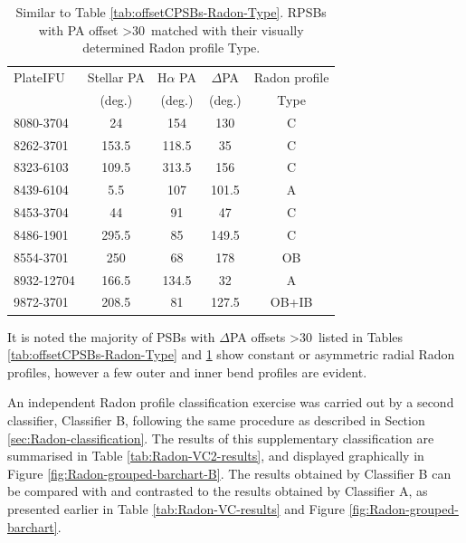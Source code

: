 \begin{table}
\centering
\caption[RPSBs with PA offset \textgreater 30\textdegree\ matched with their visually determined Radon profile Type]{Similar to Table \ref{tab:offsetCPSBs-Radon-Type}. RPSBs with PA offset \textgreater 30\textdegree\ matched with their visually determined Radon profile Type.}
\label{tab:offsetRPSBs-Radon-Type}
\begin{tabular}{lcccc}
\hline
PlateIFU   & Stellar PA & H$\alpha$ PA & $\Delta$PA & Radon profile \\
  & (deg.) & (deg.) & (deg.) & Type\\
\hline
8080-3704 & 24 & 154 & 130 & C \\
8262-3701 & 153.5 & 118.5 & 35 & C \\
8323-6103 & 109.5 & 313.5 & 156 & C \\
8439-6104 & 5.5 & 107 & 101.5 & A \\
8453-3704 & 44 & 91 & 47 & C \\
8486-1901 & 295.5 & 85 & 149.5 & C \\
8554-3701 & 250 & 68 & 178 & OB \\
8932-12704 & 166.5 & 134.5 & 32 & A \\
9872-3701 & 208.5 & 81 & 127.5 & OB+IB \\
\hline
\end{tabular}
\end{table}

It is noted the majority of PSBs with $\Delta$PA offsets \textgreater 30\textdegree\ listed in Tables \ref{tab:offsetCPSBs-Radon-Type} and \ref{tab:offsetRPSBs-Radon-Type} show constant or asymmetric radial Radon profiles, however a few outer and inner bend profiles are evident. 

\label{independent-classification}
An independent Radon profile classification exercise was carried out by a second classifier, Classifier B, following the same procedure as described in Section \ref{sec:Radon-classification}. The results of this supplementary classification are summarised in Table \ref{tab:Radon-VC2-results}, and displayed graphically in Figure \ref{fig:Radon-grouped-barchart-B}. The results obtained by Classifier B can be compared with and contrasted to the results obtained by Classifier A, as presented earlier in Table \ref{tab:Radon-VC-results} and Figure \ref{fig:Radon-grouped-barchart}.

